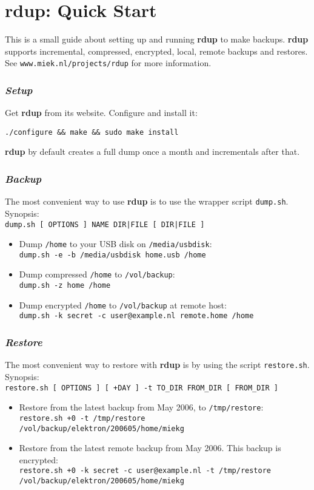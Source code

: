 \documentclass[a4paper, openany]{memoir}
\newcommand{\rdup}{\textbf{rdup}}
\newcommand{\cmd}[1]{\texttt{#1}}
\newcommand{\url}[1]{\texttt{#1}}
\newcommand{\path}[1]{\texttt{#1}}
\begin{document}
\chapter*{\rdup: Quick Start}
This is a small guide about setting up and running \rdup{} to make
backups. \rdup{}
supports incremental, compressed, encrypted, local, remote  backups and
restores. See \url{www.miek.nl/projects/rdup} for more information.

\subsection*{\textit{Setup}}
Get \rdup{} from its website. Configure and install it:
\begin{verbatim}
./configure && make && sudo make install
\end{verbatim}
\rdup{} by default creates a full dump once a month and incrementals
after that.

\subsection*{\textit{Backup}}
The most convenient way to use \rdup{} is to use the wrapper
script \cmd{dump.sh}. Synopsis:\\
\cmd{dump.sh [ OPTIONS ] NAME DIR|FILE [ DIR|FILE ]}
\begin{itemize}
\item
Dump \path{/home} to your USB disk on \path{/media/usbdisk}:\\
\cmd{dump.sh -e -b /media/usbdisk home.usb /home}
\item
Dump compressed \path{/home} to \path{/vol/backup}:\\
\cmd{dump.sh -z home /home} 
\item
Dump encrypted \path{/home} to \path{/vol/backup} at remote
host:\\
\cmd{dump.sh -k secret -c user@example.nl remote.home /home}
\end{itemize}

\subsection*{\textit{Restore}}
The most convenient way to restore with \rdup{} is by using
the script \cmd{restore.sh}. Synopsis:\\
\cmd{restore.sh [ OPTIONS ] [ +DAY ] -t TO\_DIR FROM\_DIR [ FROM\_DIR ]}
\begin{itemize}
\item
Restore from the latest backup from May 2006, to \path{/tmp/restore}:\\
\cmd{restore.sh +0 -t /tmp/restore \\
/vol/backup/elektron/200605/home/miekg}
\item
Restore from the latest remote backup from May 2006. This backup
is encrypted:\\
\cmd{restore.sh +0 -k secret -c user@example.nl -t /tmp/restore \\
/vol/backup/elektron/200605/home/miekg}
\end{itemize}
\end{document}
